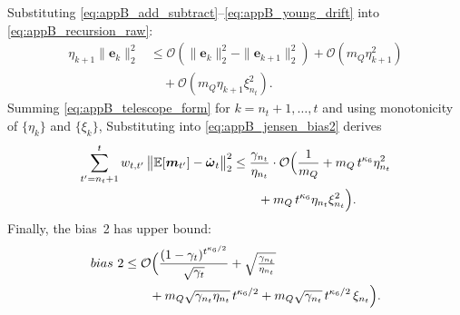 \documentclass{IEEEtran}
\begin{document}
Substituting \eqref{eq:appB_add_subtract}--\eqref{eq:appB_young_drift} into \eqref{eq:appB_recursion_raw}: 
\begin{equation}
\begin{aligned}
\eta_{k+1}\|\boldsymbol{e}_{k}\|_2^2
&\le \mathcal{O}(\|\boldsymbol{e}_{k}\|_2^2-\|\boldsymbol{e}_{k+1}\|_2^2)+\mathcal{O}(m_Q\eta_{k+1}^2)\\
&\quad+\mathcal{O}(m_Q\eta_{k+1}\xi_{n_t}^{2}).
\end{aligned}
\label{eq:appB_telescope_form}
\end{equation}
Summing \eqref{eq:appB_telescope_form} for $k=n_t+1,\ldots,t$ and using monotonicity of $\{\eta_k\}$ and $\{\xi_k\}$, Substituting into \eqref{eq:appB_jensen_bias2} derives
\begin{equation}
\begin{aligned}
\sum_{t'=n_t+1}^{t} w_{t,t'}\,\bigl\|\mathbb{E}[\boldsymbol{m}_{t'}]-\dot{\boldsymbol{\omega}}_{t}\bigr\|_2^2
&\le \frac{\gamma_{n_t}}{\eta_{n_t}}\cdot
\mathcal{O}\Bigl(
\frac{1}{m_Q}
+m_Q\,t^{\kappa_6}\eta_{n_t}^{2}\\
&\qquad
+m_Q\,t^{\kappa_6}\eta_{n_t}\xi_{n_t}^{2}
\Bigr).
\end{aligned}
\label{eq:appB_bias2_recent}
\end{equation}
Finally, the bias~2 has upper bound: 
\begin{equation}
\begin{aligned}
bias~2
&\le \mathcal{O}\Bigl(
\frac{(1-\gamma_t)^{t^{\kappa_6/2}}}{\sqrt{\gamma_t}}
+\sqrt{\tfrac{\gamma_{n_t}}{\eta_{n_t}}}\\
&\qquad
+m_Q\sqrt{\gamma_{n_t}\eta_{n_t}}\,t^{\kappa_6/2}
+m_Q\sqrt{\gamma_{n_t}}\,t^{\kappa_6/2}\,\xi_{n_t}
\Bigr).
\end{aligned}
\label{eq:appB_bias2_final}
\end{equation}
\end{document}
